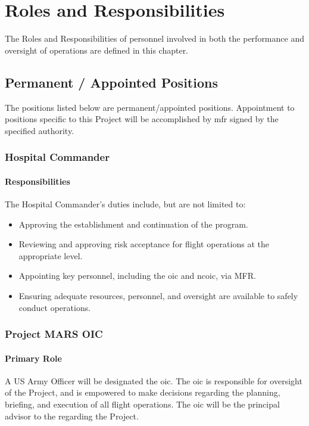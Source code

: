 \chapter{Roles and Responsibilities}
\label{ch:roles}

The Roles and Responsibilities of personnel involved in both the performance and oversight of \projectmars{} operations are defined in this chapter.

    \section{Permanent / Appointed Positions} The positions listed below are permanent/appointed positions. Appointment to positions specific to this Project will be accomplished by \ac{mfr} signed by the specified authority.

        \subsection{Hospital Commander}\label{role:hospitalcommander}

            \subsubsection{Responsibilities} The Hospital Commander's duties include, but are not limited to:
            \begin{itemize}
                \item Approving the establishment and continuation of the \projectmars{} program.
                \item Reviewing and approving risk acceptance for flight operations at the appropriate level.
                \item Appointing key personnel, including the \projectmars{} \ac{oic} and \ac{ncoic}, via MFR.
                \item Ensuring adequate resources, personnel, and oversight are available to safely conduct operations.
            \end{itemize}
    
        \subsection{Project MARS OIC}\label{role:projectoic}

            \subsubsection{Primary Role}A US Army Officer will be designated the \projectmars{} \ac{oic}. The \ac{oic} is responsible for oversight of the Project, and is empowered to make decisions regarding the planning, briefing, and execution of all flight operations. The \ac{oic} will be the principal advisor to the  regarding the Project. 
            
